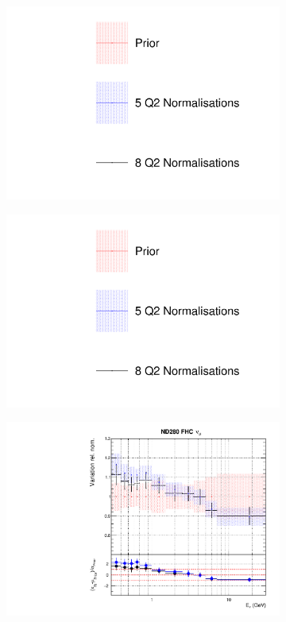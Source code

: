 \begin{figure}
\centering
\begin{subfigure}{0.3\textwidth}
  \centering
  \includegraphics[width=1.0\linewidth, trim={5mm  130mm 0mm 10mm}, clip]{figs/comp5q2vs8q2_leg}
\end{subfigure}
\begin{subfigure}{0.3\textwidth}
  \centering
  \includegraphics[width=1.0\linewidth, trim={5mm  0mm 0mm 70mm}, clip]{figs/comp5q2vs8q2_leg}
\end{subfigure}
\begin{subfigure}{0.45\textwidth}
  \centering
  \includegraphics[width=0.75\linewidth]{figs/comp5q2vs8q2flux0}

\end{subfigure}
\end{figure}
